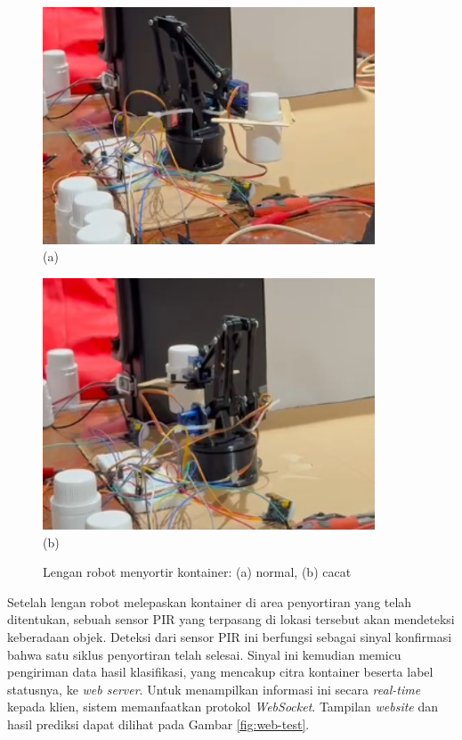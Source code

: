 \begin{figure}[H]
  \centering
  \begin{minipage}{\textwidth}
    \centering
    \includegraphics[width=0.88\textwidth]{gambar/robot_normal.jpeg}\\
    (a)
  \end{minipage}
  \vspace{1em}

  \begin{minipage}{\textwidth}
    \centering
    \includegraphics[width=0.88\textwidth]{gambar/robot_cacat.jpeg}\\
    (b)
  \end{minipage}
  \caption{Lengan robot menyortir kontainer: (a) normal, (b) cacat}
  \label{fig:robot-only}
  \vspace{-1em}
\end{figure}

Setelah lengan robot melepaskan kontainer di area penyortiran yang
telah ditentukan, sebuah sensor PIR yang terpasang di lokasi
tersebut akan mendeteksi keberadaan objek. Deteksi dari sensor PIR
ini berfungsi sebagai sinyal konfirmasi bahwa satu siklus penyortiran
telah selesai. Sinyal ini kemudian memicu pengiriman data hasil
klasifikasi, yang mencakup citra kontainer beserta label statusnya,
ke \textit{web server}. Untuk menampilkan informasi ini secara
\textit{real-time} kepada klien, sistem memanfaatkan protokol
\textit{WebSocket}. Tampilan \textit{website} dan hasil prediksi
dapat dilihat pada Gambar \ref{fig:web-test}.

